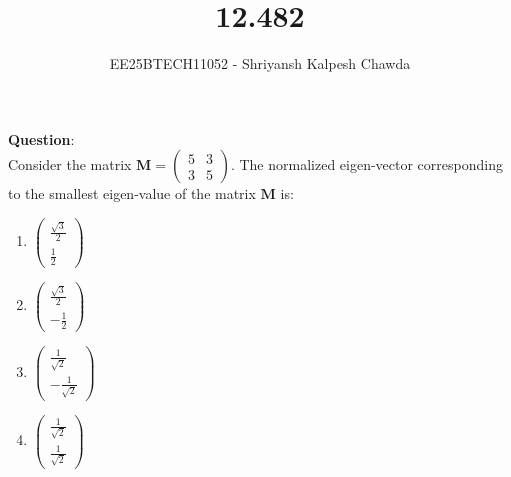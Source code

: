 \documentclass[journal]{IEEEtran}
\newcommand{\myvec}[1]{\ensuremath{\begin{pmatrix}#1\end{pmatrix}}}
\begin{document}
	
	
	\vspace{3cm}
	
	\title{12.482}
	\author{EE25BTECH11052 - Shriyansh Kalpesh Chawda}
	{\let\newpage\relax\maketitle}
	
	\renewcommand{\thefigure}{\theenumi}
	\renewcommand{\thetable}{\theenumi}
	\setlength{\intextsep}{10pt} 
	
	\renewcommand{\thetable}{\theenumi}
	\textbf{Question}:\\
	Consider the matrix $\mathbf{M} = \myvec{5 & 3\\3 & 5}$. The normalized eigen-vector corresponding to the smallest eigen-value of the matrix $\mathbf{M}$ is:
	
	\begin{multicols}{4}
		\begin{enumerate}
			\item $\begin{pmatrix} \frac{\sqrt{3}}{2} \\ \frac{1}{2} \end{pmatrix}$
			\item $\begin{pmatrix} \frac{\sqrt{3}}{2} \\ -\frac{1}{2} \end{pmatrix}$
			\item $\begin{pmatrix} \frac{1}{\sqrt{2}} \\ -\frac{1}{\sqrt{2}} \end{pmatrix}$
			\item $\begin{pmatrix} \frac{1}{\sqrt{2}} \\ \frac{1}{\sqrt{2}} \end{pmatrix}$
			\end{enumerate}
	\end{multicols}
	
\end{document}
